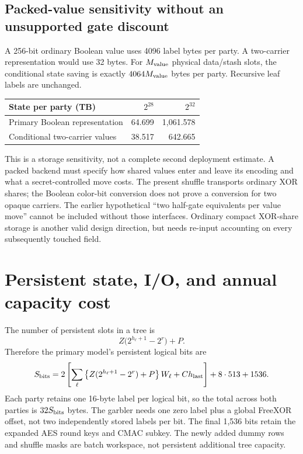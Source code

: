 \documentclass[11pt]{article}
\begin{document}
\subsection{Packed-value sensitivity without an unsupported gate discount}
A 256-bit ordinary Boolean value uses 4096 label bytes per party. A
two-carrier representation would use 32 bytes. For $M_{\rm value}$ physical
data/stash slots, the conditional state saving is exactly
$4064M_{\rm value}$ bytes per party. Recursive leaf labels are unchanged.

\begin{center}\small
\begin{tabular}{lrr}\toprule
State per party (TB) & $2^{28}$ & $2^{32}$\\\midrule
Primary Boolean representation & 64.699 & 1,061.578\\
Conditional two-carrier values & 38.517 & 642.665\\
\bottomrule\end{tabular}
\end{center}

This is a storage sensitivity, not a complete second
deployment estimate. A packed backend must specify how shared values enter
and leave its encoding and what a secret-controlled move costs. The present
shuffle transports ordinary XOR shares; the Boolean color-bit conversion does
not prove a conversion for two opaque carriers. The earlier hypothetical
``two half-gate equivalents per value move'' cannot be included without those
interfaces. Ordinary compact XOR-share storage is another valid design
direction, but needs re-input accounting on every subsequently touched field.


\section{Persistent state, I/O, and annual capacity cost}
\label{sec:deployment}
The number of persistent slots in a tree is
\begin{equation}
 Z\bigl(2^{h_\ell+1}-2^r\bigr)+P.
\end{equation}
Therefore the primary model's persistent logical bits are
\begin{equation}
 S_{\rm bits}=2\left[\sum_\ell
 \left\{Z(2^{h_\ell+1}-2^r)+P\right\}W_\ell+C h_{\rm last}\right]
 +8\cdot513+1536.
\end{equation}
Each party retains one 16-byte label per logical bit, so the total across
both parties is $32S_{\rm bits}$ bytes. The garbler needs one zero label plus
a global FreeXOR offset, not two independently stored labels per bit.
The final 1,536 bits retain the expanded AES round keys and CMAC subkey.
The newly added dummy rows and shuffle masks are batch workspace, not
persistent additional tree capacity.
\end{document}
